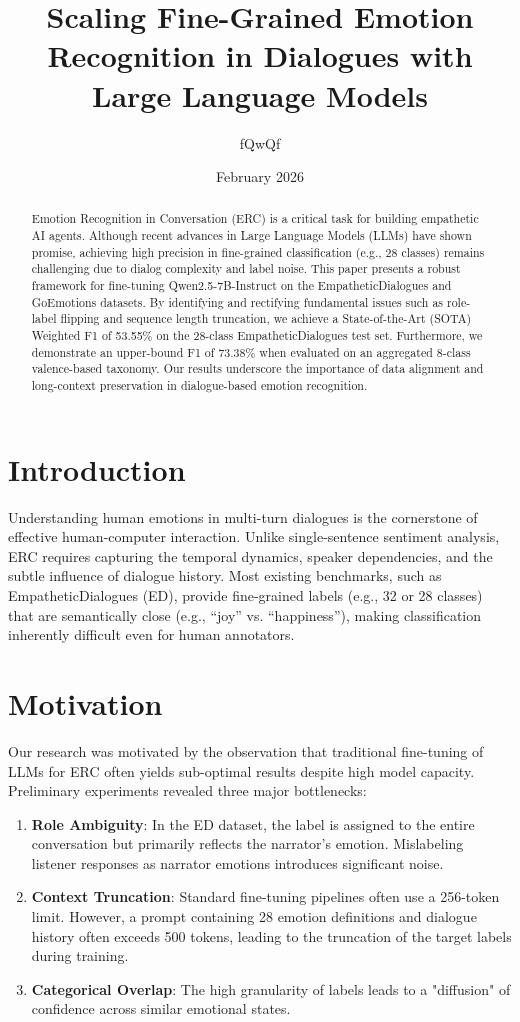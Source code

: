 \documentclass[11pt]{article}
\title{Scaling Fine-Grained Emotion Recognition in Dialogues with Large Language Models}
\author{fQwQf}
\date{February 2026}
\begin{document}
\maketitle

\begin{abstract}
Emotion Recognition in Conversation (ERC) is a critical task for building empathetic AI agents. Although recent advances in Large Language Models (LLMs) have shown promise, achieving high precision in fine-grained classification (e.g., 28 classes) remains challenging due to dialog complexity and label noise. This paper presents a robust framework for fine-tuning Qwen2.5-7B-Instruct on the EmpatheticDialogues and GoEmotions datasets. By identifying and rectifying fundamental issues such as role-label flipping and sequence length truncation, we achieve a State-of-the-Art (SOTA) Weighted F1 of 53.55\% on the 28-class EmpatheticDialogues test set. Furthermore, we demonstrate an upper-bound F1 of 73.38\% when evaluated on an aggregated 8-class valence-based taxonomy. Our results underscore the importance of data alignment and long-context preservation in dialogue-based emotion recognition.
\end{abstract}

\section{Introduction}
Understanding human emotions in multi-turn dialogues is the cornerstone of effective human-computer interaction. Unlike single-sentence sentiment analysis, ERC requires capturing the temporal dynamics, speaker dependencies, and the subtle influence of dialogue history. Most existing benchmarks, such as EmpatheticDialogues (ED), provide fine-grained labels (e.g., 32 or 28 classes) that are semantically close (e.g., ``joy'' vs. ``happiness''), making classification inherently difficult even for human annotators.

\section{Motivation}
Our research was motivated by the observation that traditional fine-tuning of LLMs for ERC often yields sub-optimal results despite high model capacity. Preliminary experiments revealed three major bottlenecks:
\begin{enumerate}
    \item \textbf{Role Ambiguity}: In the ED dataset, the label is assigned to the entire conversation but primarily reflects the narrator's emotion. Mislabeling listener responses as narrator emotions introduces significant noise.
    \item \textbf{Context Truncation}: Standard fine-tuning pipelines often use a 256-token limit. However, a prompt containing 28 emotion definitions and dialogue history often exceeds 500 tokens, leading to the truncation of the target labels during training.
    \item \textbf{Categorical Overlap}: The high granularity of labels leads to a "diffusion" of confidence across similar emotional states.
\end{enumerate}
\end{document}
